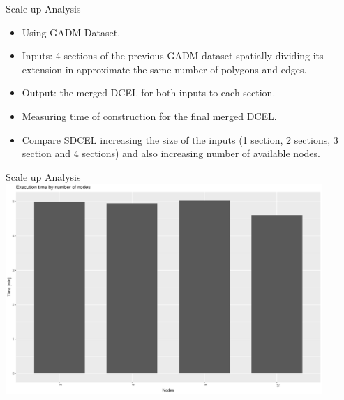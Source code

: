 \documentclass{beamer}
\begin{document}
\begin{frame}{Scale up Analysis}
    \begin{itemize}
        \item Using GADM Dataset.
        \item Inputs: 4 sections of the previous GADM dataset spatially dividing its extension in approximate the same number of polygons and edges. 
        \item Output: the merged DCEL for both inputs to each section.
        \item Measuring time of construction for the final merged DCEL.
        \item Compare SDCEL increasing the size of the inputs (1 section, 2 sections, 3 section and 4 sections) and also increasing number of available nodes.
    \end{itemize}
\end{frame}
\begin{frame}{Scale up Analysis}
    \centering 
    \includegraphics[width=0.9\textwidth]{figures/scaleup.pdf}
\end{frame}
\end{document}
